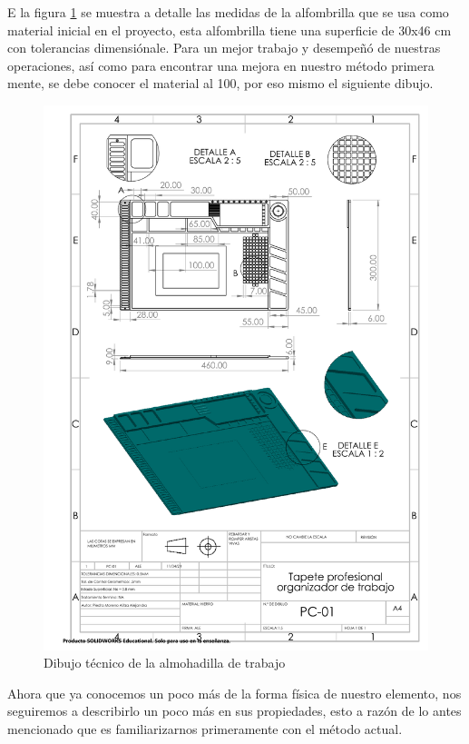     
    E la figura \ref{fig:almohadillaD} se muestra a detalle las medidas de la alfombrilla que se usa como material inicial en el proyecto, esta alfombrilla tiene una superficie de 30x46 cm con tolerancias dimensiónale. Para un mejor trabajo y desempeñó de nuestras operaciones, así como para encontrar una mejora en nuestro método primera mente, se debe conocer el material al 100, por eso mismo el siguiente dibujo.
    
    \begin{figure}[H]
        \centering
        \includegraphics[trim = {20mm 145mm 10mm 42mm},clip,scale=0.4]{22/Img/almohadillaDibujo.pdf}
        \caption{Dibujo técnico de la almohadilla de trabajo}
        \label{fig:almohadillaD}
    \end{figure}
    
    Ahora que ya conocemos un poco más de la forma física de nuestro elemento, nos seguiremos a describirlo un poco más en sus propiedades, esto a razón de lo antes mencionado que es familiarizarnos primeramente con el método actual.
    

